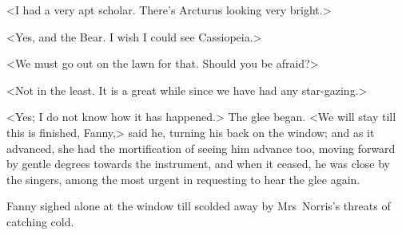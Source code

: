 <I had a very apt scholar. There's Arcturus looking very bright.>

<Yes, and the Bear. I wish I could see Cassiopeia.>

<We must go out on the lawn for that. Should you be afraid?>

<Not in the least. It is a great while since we have had any star-gazing.>

<Yes; I do not know how it has happened.> The glee began. <We will stay till this is finished, Fanny,> said he, turning his back on the window; and as it advanced, she had the mortification of seeing him advance too, moving forward by gentle degrees towards the instrument, and when it ceased, he was close by the singers, among the most urgent in requesting to hear the glee again.

Fanny sighed alone at the window till scolded away by Mrs~Norris's threats of catching cold. 